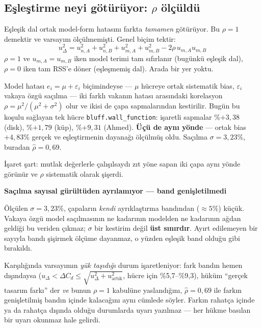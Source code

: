 \documentclass[11pt,a4paper]{article}
\newcommand{\kkkenar}{lacivert}
\newcommand{\kkzemin}{kod}
\newenvironment{renkkutu}[3]{%
  \renewcommand{\kkkenar}{#1}\renewcommand{\kkzemin}{#2}%
  \par\medskip\noindent
  \begin{lrbox}{\kutugovde}%
  \begin{minipage}{\dimexpr\linewidth-2\fboxsep-2\fboxrule\relax}\footnotesize
  \textcolor{#1}{\textbf{#3}}\par\vspace{3pt}%
}{%
  \end{minipage}%
  \end{lrbox}%
  \noindent\fcolorbox{\kkkenar}{\kkzemin}{\usebox{\kutugovde}}%
  \par\medskip
}
\newenvironment{dikkat}[1]{\begin{renkkutu}{orta}{ortabg}{#1}}{\end{renkkutu}}
\begin{document}
\subsection{Eşleştirme neyi götürüyor: $\rho$ ölçüldü}
\label{sub:rho}

Eşleşik dal ortak model-form hatasını farkta \emph{tamamen} götürüyor. Bu
$\rho{=}1$ demektir ve varsayım ölçülmemişti. Genel biçim tektir:
\[
u_{\Delta}^2 = u_{n,A}^2 + u_{n,B}^2 + u_{m,A}^2 + u_{m,B}^2
               - 2\rho\,u_{m,A}u_{m,B}
\]
$\rho{=}1$ ve $u_{m,A}{=}u_{m,B}$ iken model terimi tam sıfırlanır (bugünkü
eşleşik dal), $\rho{=}0$ iken tam RSS'e döner (eşleşmemiş dal). Arada bir yer
yoktu.

Model hatası $e_i = \mu + \varepsilon_i$ biçimindeyse --- $\mu$ hücreye ortak
sistematik bias, $\varepsilon_i$ vakaya özgü saçılma --- iki farklı vakanın
hatası arasındaki korelasyon $\rho = \mu^2/(\mu^2+\sigma^2)$ olur ve ikisi de
çapa sapmalarından kestirilir. Bugün bu koşulu sağlayan tek hücre
\texttt{bluff.wall\_function}: işaretli sapmalar \%$+3{,}38$ (disk),
\%$+1{,}79$ (küp), \%$+9{,}31$ (Ahmed). \textbf{Üçü de aynı yönde} --- ortak
bias $+4{,}83\%$ gerçek ve eşleştirmenin dayanağı ölçülmüş oldu. Saçılma
$\sigma = 3{,}23\%$, buradan $\hat\rho = 0{,}69$.

İşaret şart: mutlak değerlerle çalışılsaydı zıt yöne sapan iki çapa aynı yönde
görünür ve $\rho$ sistematik olarak şişerdi.

\begin{dikkat}{Saçılma sayısal gürültüden ayrılamıyor --- band genişletilmedi}
Ölçülen $\sigma{=}3{,}23\%$, çapaların \emph{kendi} ayrıklaştırma bandından
($\approx\!5\%$) küçük. Vakaya özgü model saçılmasının ne kadarının modelden
ne kadarının ağdan geldiği bu veriden çıkmaz; $\sigma$ bir kestirim değil
\textbf{üst sınırdır}. Ayırt edilemeyen bir sayıyla bandı şişirmek ölçüme
dayanmaz, o yüzden eşleşik band olduğu gibi bırakıldı.

Karşılığında varsayımın \emph{yük taşıdığı} durum işaretleniyor: fark bandın
hemen dışındaysa ($u_\Delta < \Delta C_d \le \sqrt{u_\Delta^2+u_{\text{artık}}^2}$,
hücre için \%5{,}7--\%9{,}3), hüküm ``gerçek tasarım farkı'' der \emph{ve}
bunun $\rho{=}1$ kabulüne yaslandığını, $\hat\rho{=}0{,}69$ ile farkın
genişletilmiş bandın içinde kalacağını aynı cümlede söyler. Farkın rahatça
içinde ya da rahatça dışında olduğu durumlarda uyarı yazılmaz --- her hükme
basılan bir uyarı okunmaz hale gelirdi.
\end{dikkat}
\end{document}
